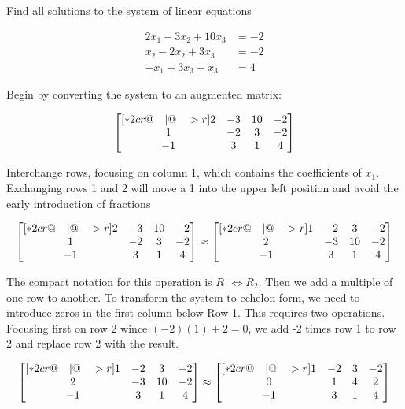         \textit{} Find all solutions to the system of linear equations

        \begin{align*}
            2x_1 - 3x_2 + 10x_3 &= -2 \\
            x_2 - 2x_2 + 3x_3   &= -2 \\
            -x_1 + 3x_3 + x_3   &= 4
        \end{align*}

        Begin by converting the system to an augmented matrix:

        \[
            \begin{bmatrix}[*2cr@{\quad}|@{\quad}>{\color{red}}r]
                2   & -3    & 10    & -2 \\
                1   & -2    & 3     & -2 \\
                -1  & 3     & 1     & 4
            \end{bmatrix}
        \]

        Interchange rows, focusing on column 1, which contains the coefficients of $x_1$. Exchanging rows 1 and 2 will move a 1 into the upper left position and avoid the early introduction of fractions

        \[
            \begin{bmatrix}[*2cr@{\quad}|@{\quad}>{\color{red}}r]
                2   & -3    & 10    & -2 \\
                1   & -2    & 3     & -2 \\
                -1  & 3     & 1     & 4
            \end{bmatrix}
            \approx
            \begin{bmatrix}[*2cr@{\quad}|@{\quad}>{\color{red}}r]
                1   & -2    & 3     & -2 \\
                2   & -3    & 10    & -2 \\
                -1  & 3     & 1     & 4
            \end{bmatrix}
        \]

        The compact notation for this operation is $R_1 \iff R_2$. Then we add a multiple of one row to another. To transform the system to echelon form, we need to introduce zeros in the first column below Row 1. This
        requires two operations. Focusing first on row 2 wince $(-2)(1) + 2 = 0$, we add -2 times row 1 to row 2 and replace row 2 with the result.

        \[
            \begin{bmatrix}[*2cr@{\quad}|@{\quad}>{\color{red}}r]
                1   & -2    & 3     & -2 \\
                2   & -3    & 10    & -2 \\
                -1  & 3     & 1     & 4
            \end{bmatrix}
            \approx
            \begin{bmatrix}[*2cr@{\quad}|@{\quad}>{\color{red}}r]
                1   & -2    & 3     & -2 \\
                0   & 1     & 4     & 2 \\
                -1  & 3     & 1     & 4
            \end{bmatrix}
        \]

